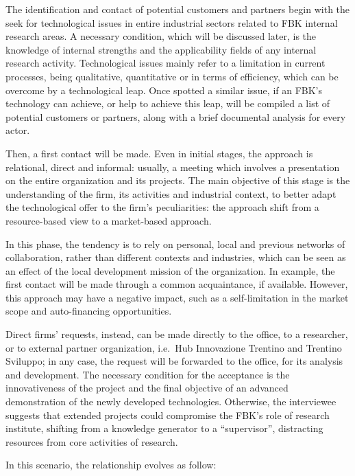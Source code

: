The identification and contact of potential customers and partners begin with the seek for technological issues in entire industrial sectors related to FBK internal research areas. A necessary condition, which will be discussed later, is the knowledge of internal strengths and the applicability fields of any internal research activity. Technological issues mainly refer to a limitation in current processes, being qualitative, quantitative or in terms of efficiency, which can be overcome by a technological leap. Once spotted a similar issue, if an FBK's technology can achieve, or help to achieve this leap, will be compiled a list of potential customers or partners, along with a brief documental analysis for every actor. 

Then, a first contact will be made. Even in initial stages, the approach is relational, direct and informal: usually, a meeting which involves a presentation on the entire organization and its projects. The main objective of this stage is the understanding of the firm, its activities and industrial context, to better adapt the technological offer to the firm’s peculiarities: the approach shift from a resource-based view to a market-based approach.
 
In this phase, the tendency is to rely on personal, local and previous networks of collaboration, rather than different contexts and industries, which can be seen as an effect of the local development mission of the organization. In example, the first contact will be made through a common acquaintance, if available. However, this approach may have a negative impact, such as a self-limitation in the market scope and auto-financing opportunities.

Direct firms’ requests, instead, can be made directly to the office, to a researcher, or to external partner organization, i.e.\ Hub Innovazione Trentino and Trentino Sviluppo; in any case, the request will be forwarded to the office, for its analysis and development. The necessary condition for the acceptance is the innovativeness of the project and the final objective of an advanced demonstration of the newly developed technologies. Otherwise, the interviewee suggests that extended projects could compromise the FBK's role of research institute, shifting from a knowledge generator to a \enquote{supervisor}, distracting resources from core activities of research.

In this scenario, the relationship evolves as follow:

